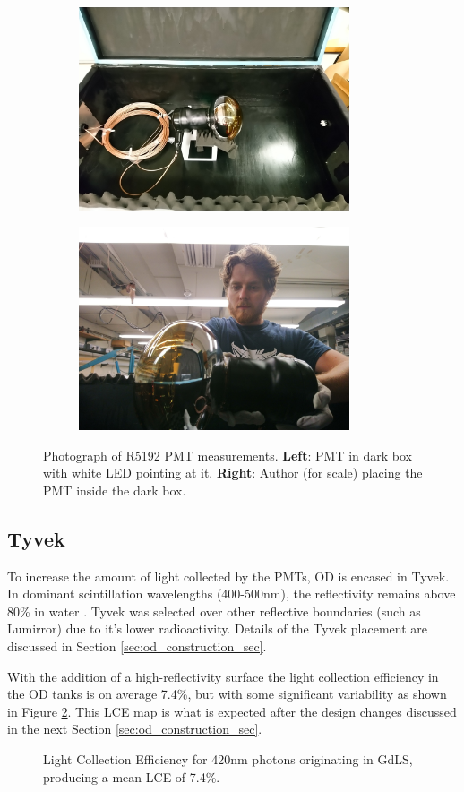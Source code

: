 \begin{figure}[!htbp]
\begin{subfigure}{.5\textwidth}
  \centering
  \includegraphics[height=6cm, width=\linewidth]{Figures/OD_PMTs/od_pmt_in_dark_box.JPG}
  \end{subfigure}
  \begin{subfigure}{.5\textwidth}
  \centering
  \includegraphics[height=6cm, width=\linewidth]{Figures/OD_PMTs/sam_holding_od_pmt.JPG}
  \end{subfigure}
\caption{Photograph of R5192 PMT measurements. \textbf{Left}: PMT in dark box with white LED pointing at it. \textbf{Right}: Author (for scale) placing the PMT inside the dark box.}
\label{fig:od_pmt_brandeis_measurements}
\end{figure}


\subsection{Tyvek}
\par
To increase the amount of light collected by the PMTs, OD is encased in Tyvek.
In dominant scintillation wavelengths (400-500nm), the reflectivity remains above 80\% in water \cite{tyvek_thesis_ref,tyvek_reflectivity_ref}. 
Tyvek was selected over other reflective boundaries (such as Lumirror{\texttrademark}) due to it's lower radioactivity.
Details of the Tyvek placement are discussed in Section \ref{sec:od_construction_sec}.
\par
With the addition of a high-reflectivity surface the light collection efficiency in the OD tanks is on average 7.4\%, but with some significant variability as shown in Figure \ref{fig:od_lce}.
This LCE map is what is expected after the design changes discussed in the next Section \ref{sec:od_construction_sec}.

\begin{figure}[!htbp]
\centering
\resizebox{\textwidth}{!}{

}
\caption{Light Collection Efficiency for 420nm photons originating in GdLS, producing a mean LCE of 7.4\%.}
\label{fig:od_lce}
\end{figure}
